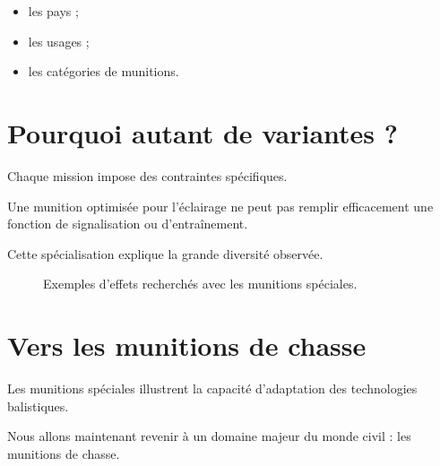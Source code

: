 \begin{itemize}
    \item les pays ;
    \item les usages ;
    \item les catégories de munitions.
\end{itemize}

\section{Pourquoi autant de variantes ?}

Chaque mission impose des contraintes spécifiques.

Une munition optimisée pour l'éclairage ne peut pas remplir efficacement une
fonction de signalisation ou d'entraînement.

Cette spécialisation explique la grande diversité observée.

\begin{figure}[htbp]
\centering


\caption{Exemples d'effets recherchés avec les munitions spéciales.}
\label{fig:effets_munitions_speciales}

\end{figure}

\section{Vers les munitions de chasse}

Les munitions spéciales illustrent la capacité d'adaptation des technologies
balistiques.

Nous allons maintenant revenir à un domaine majeur du monde civil : les
munitions de chasse.

